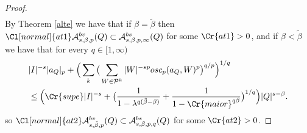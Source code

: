 \documentclass{amsart}
\theoremstyle{definition}
\newcommand{\Cll}[2][normal]{\Cl[#1]{#2}}
\newcommand{\Crr}[1]{\Cr{#1}}
\begin{document}
\begin{proof}
\begin{align*}
\end{align*}
By Theorem \ref{alte} we have that if $\beta=\tilde{\beta}$ then  $\Cll{at1} \mathcal{A}^{bv}_{s, \beta,p}(Q)\subset \mathcal{A}^{bs}_{s,\beta,p,\infty}(Q)$ for some $\Crr{at1} > 0$, and if $\beta < \tilde{\beta}$ we have   that for every $q \in [1,\infty)$ 
\begin{align*}
&|I|^{-s}|a_Q|_p+\Big( \sum_{k} \big( \sum_{W\in \mathcal{P}^k} |W|^{-sp} osc_p(a_Q,W)^p \big)^{q/p}\Big)^{1/q} \\
&\leq \Big(  \Crr{supe} |I|^{-s}+\big( \frac{1}{1-\lambda^{q(\tilde{\beta}-\beta)}}    +  \frac{1}{1-\Crr{maior}^{q\beta}}  \big)^{1/q} \Big)   |Q|^{s-\beta} .\\
\end{align*}
so $\Cll{at2} \mathcal{A}^{bv}_{s, \tilde{\beta},p}(Q)\subset \mathcal{A}^{bs}_{s,\beta,p,q}(Q)$ for some $\Crr{at2} > 0$.
\end{proof}

 
 
\end{document}
